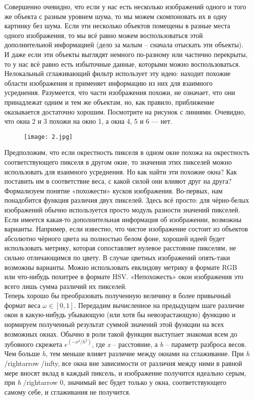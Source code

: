 \documentclass[a4paper,12pt]{article}
\begin{document}
Совершенно очевидно, что если у нас есть несколько изображений одного и того же объекта с разным уровнем шума, то мы можем скомпоновать их в одну картинку без шума. Если эти несколько объектов помещены в разные места одного изображения, то мы всё равно можем воспользоваться этой дополнительной информацией (дело за малым – сначала отыскать эти объекты). И даже если эти объекты выглядят немного по-разному или частично перекрыты, то у нас всё равно есть избыточные данные, которыми можно воспользоваться. Нелокальный сглаживающий фильтр использует эту идею: находит похожие области изображения и применяет информацию из них для взаимного усреднения. Разумеется, что части изображения похожи, не означает, что они принадлежат одним и тем же объектам, но, как правило, приближение оказывается достаточно хорошим. Посмотрите на рисунок с линиями. Очевидно, что окна 2 и 3 похожи на окно 1, а окна 4, 5 и 6 — нет. 

\begin{figure}[h]
\centering
\texttt{[image: 2.jpg]}
\label{fig:mpr}
\end{figure}

Предположим, что если окрестность пикселя в одном окне похожа на окрестность соответствующего пикселя в другом окне, то значения этих пикселей можно использовать для взаимного усреднения. Но как найти эти похожие окна? Как поставить им в соответствие веса, с какой силой они влияют друг на друга? Формализуем понятие «похожести» кусков изображения. Во-первых, нам понадобится функция различия двух пикселей. Здесь всё просто: для чёрно-белых изображений обычно используется просто модуль разности значений пикселей. Если имеется какая-то дополнительная информация об изображении, возможны варианты. Например, если известно, что чистое изображение состоит из объектов абсолютно чёрного цвета на полностью белом фоне, хорошей идеей будет использовать метрику, которая сопоставляет нулевое расстояние пикселям, не сильно отличающимся по цвету. В случае цветных изображений опять-таки возможны варианты. Можно использовать евклидову метрику в формате RGB или что-нибудь похитрее в формате HSV. «Непохожесть» окон изображения это всего лишь сумма различий их пикселей.\\

Теперь хорошо бы преобразовать полученную величину в более привычный формат веса \textit{$\omega\in[0,1]$}. Передадим вычисленное на предыдущем шаге различие окон в какую-нибудь убывающую (или хотя бы невозрастающую) функцию и нормируем полученный результат суммой значений этой функции на всех возможных окнах. Обычно в роли такой функции выступает знакомая всем до зубовного скрежета \textit{$e^{(-x^2/h^2)}$}, где \textit{x} – расстояние, а \textit{h} – параметр разброса весов. Чем больше \textit{h}, тем меньше влияет различие между окнами на сглаживание. При \textit{h}  /rightarrow /infty, все окна вне зависимости от различия между ними в равной мере вносят вклад в каждый пиксель, и изображение получится идеально серым, при \textit{h} /rightarrow 0, значимый вес будет только у окна, соответствующего самому себе, и сглаживания не получится.\\
\end{document}

